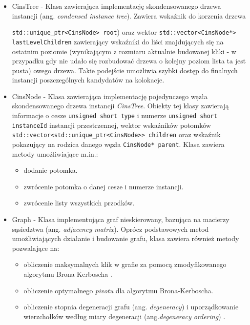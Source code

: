 \documentclass[12pt]{article}
\newcounter{algorytm}
\def\inline{\lstinline[basicstyle=\ttfamily,keywordstyle={}]}
\begin{document}
\begin{itemize}
\begin{minipage}{\linewidth}
\begin{lstlisting}[caption={Kod struktury ITMPack}]

	struct ITMPack
	{
		InstanceTableMapPtr map;
		thrust::device_vector<unsigned int> begins;
		thrust::device_vector<unsigned int> counts;
		thrust::device_vector<FeatureInstanceTuple> uniques;
		unsigned int count;
	};
\end{lstlisting}
\end{minipage}

\item CinsTree - Klasa zawierająca implementację skondensowanego drzewa instancji (ang. \textit{condensed instance tree}). Zawiera wskaźnik do korzenia drzewa \raggedright \inline{std::unique_ptr<CinsNode> root}) oraz wektor \inline{std::vector<CinsNode*> lastLevelChildren} zawierający wskaźniki do liści znajdujących się na ostatnim poziomie (wynikającym z rozmiaru aktualnie budowanej kliki - w przypadku gdy nie udało się rozbudować drzewa o kolejny poziom lista ta jest pusta) owego drzewa. Takie podejście umożliwia szybki dostęp do finalnych instancji poszczególnych kandydatów na kolokacje.

\item CinsNode - Klasa zawierająca implementację pojedynczego węzła skondensowanego drzewa instancji \textit{CinsTree}. Obiekty tej klasy zawierają informacje o cesze \inline{unsigned short type} i numerze \inline{unsigned short instanceId} instancji przestrzennej, wektor wskaźników potomków \inline{std::vector<std::unique_ptr<CinsNode>> children} oraz wskaźnik pokazujący na rodzica danego węzła \inline{CinsNode* parent}. Klasa zawiera metody umożliwiające m.in.:

\begin{itemize}
\item dodanie potomka.
\item zwrócenie potomka o danej cesze i numerze instancji.
\item zwrócenie listy wszystkich przodków.
\end{itemize}

\item Graph - Klasa implementująca graf nieskierowany, bazująca na macierzy sąsiedztwa (ang. \textit{adjacency matrix}). Oprócz podstawowych metod umożliwiających działanie i budowanie grafu, klasa zawiera również metody pozwalające na:

\begin{itemize}
\item obliczenie maksymalnych klik w grafie za pomocą zmodyfikowanego algorytmu Brona-Kerboscha \cite{chinczyki}.
\item obliczenie optymalnego \textit{pivotu} \cite{pivot} dla algorytmu Brona-Kerboscha.
\item obliczenie stopnia degeneracji grafu (ang. \textit{degeneracy}) i uporządkowanie wierzchołków według miary degeneracji (ang.\textit{degeneracy ordering}) \cite{degenerat}.
\end{itemize}


\end{itemize}
\end{document}

